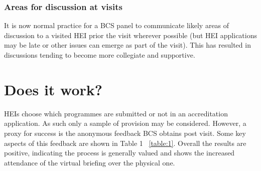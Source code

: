 \documentclass[sigconf]{acmart}
\begin{document}
\subsubsection{Areas for discussion at visits}
It is now normal practice for a BCS panel to communicate likely areas of discussion to a visited HEI prior the visit wherever  possible (but HEI applications may be late or other issues can emerge as part of the visit).   This has resulted in discussions tending to become more collegiate and supportive. 
\begin{comment}
\subsection{Promoting the value of accreditation}
The value proposition discussed in this document is a definition of the value of accreditation from those who are intimately involved. BCS is in the process of initiating a conversation to explore the value proposition of accreditation from the point of view of other stakeholders.
\end{comment}

\section {Does it work?}

HEIs choose which programmes are submitted or not in an accreditation application. As such only a sample of provision may be considered. However, a proxy for success is the anonymous feedback BCS obtains post visit. Some key aspects of this feedback are shown in Table 1 ~\ref{table:1}. Overall the results are positive, indicating the process is generally valued and shows the increased attendance of the virtual briefing over the physical one.
\end{document}
